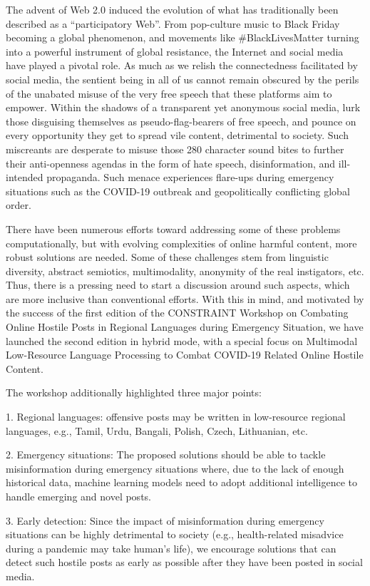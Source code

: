 The advent of Web 2.0 induced the evolution of what has traditionally been described as a “participatory Web”. From pop-culture music to Black Friday becoming a global phenomenon, and movements like #BlackLivesMatter turning into a powerful instrument of global resistance, the Internet and social media have played a pivotal role. As much as we relish the connectedness facilitated by social media, the sentient being in all of us cannot remain obscured by the perils of the unabated misuse of the very free speech that these platforms aim to empower. Within the shadows of a transparent yet anonymous social media, lurk those disguising themselves as pseudo-flag-bearers of free speech, and pounce on every opportunity they get to spread vile content, detrimental to society. Such miscreants are desperate to misuse those 280 character sound bites to further their anti-openness agendas in the form of hate speech, disinformation, and ill-intended propaganda. Such menace experiences flare-ups during emergency situations such as the COVID-19 outbreak and geopolitically conflicting global order.

There have been numerous efforts toward addressing some of these problems computationally, but with evolving complexities of online harmful content, more robust solutions are needed. Some of these challenges stem from linguistic diversity, abstract semiotics, multimodality, anonymity of the real instigators, etc. Thus, there is a pressing need to start a discussion around such aspects, which are more inclusive than conventional efforts. With this in mind, and motivated by the success of the first edition of the CONSTRAINT Workshop on ​Combating Online Ho​st​ile Posts in ​Regional Languages during Emergency Situation, we have launched the second edition in hybrid mode, with a special focus on Multimodal Low-Resource Language Processing to Combat COVID-19 Related Online Hostile Content.    

The workshop additionally highlighted three major points:

1. Regional languages: offensive posts may be written in low-resource regional languages, e.g., Tamil, Urdu, Bangali, Polish, Czech, Lithuanian, etc.

2.  Emergency situations: ​The proposed solutions should be able to tackle misinformation during emergency situations where, due to the lack of enough historical data, machine learning models need to adopt additional intelligence to handle emerging and novel posts.

3. Early detection: ​Since the impact of misinformation during emergency situations can be highly detrimental to society (e.g., health-related misadvice during a pandemic may take human's life), we encourage solutions that can detect such hostile posts as early as possible after they have been posted in social media.

